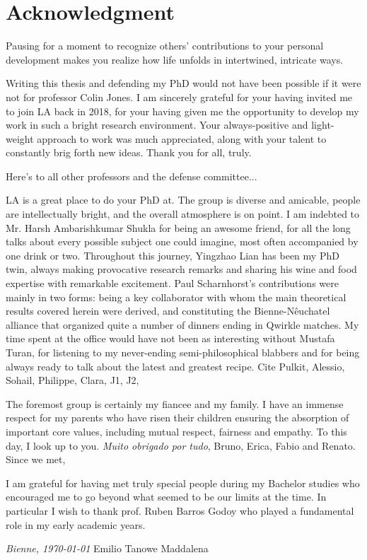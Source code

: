\chapter*{Acknowledgment}
Pausing for a moment to recognize others' contributions to your personal development makes you realize how life unfolds in intertwined, intricate ways.

Writing this thesis and defending my PhD would not have been possible if it were not for professor Colin Jones. I am sincerely grateful for your having invited me to join LA back in 2018, for your having given me the opportunity to develop my work in such a bright research environment. Your always-positive and light-weight approach to work was much appreciated, along with your talent to constantly brig forth new ideas. Thank you for all, truly.

Here's to all other professors and the defense committee...

LA is a great place to do your PhD at. The group is diverse and amicable, people are intellectually bright, and the overall atmosphere is on point. I am indebted to Mr. Harsh Ambarishkumar Shukla for being an awesome friend, for all the long talks about every possible subject one could imagine, most often accompanied by one drink or two. Throughout this journey, Yingzhao Lian has been my PhD twin, always making provocative research remarks and sharing his wine and food expertise with remarkable excitement. Paul Scharnhorst's contributions were mainly in two forms: being a key collaborator with whom the main theoretical results covered herein were derived, and constituting the Bienne-Nêuchatel alliance that organized quite a number of dinners ending in Qwirkle matches. My time spent at the office would have not been as interesting without Mustafa Turan, for listening to my never-ending semi-philosophical blabbers and for being always ready to talk about the latest and greatest recipe. Cite Pulkit, Alessio, Sohail, Philippe, Clara, J1, J2, 

The foremost group is certainly my fiancee and my family. I have an immense respect for my parents who have risen their children ensuring the absorption of important core values, including mutual respect, fairness and empathy.  To this day, I look up to you. \textit{Muito obrigado por tudo}, Bruno, Erica, Fabio and Renato. Since we met, 

I am grateful for having met truly special people during my Bachelor studies who encouraged me to go beyond what seemed to be our limits at the time. In particular I wish to thank prof. Ruben Barros Godoy who played a fundamental role in my early academic years. 


\bigskip
 
\noindent\textit{Bienne, \today}
\hfill Emilio Tanowe Maddalena
